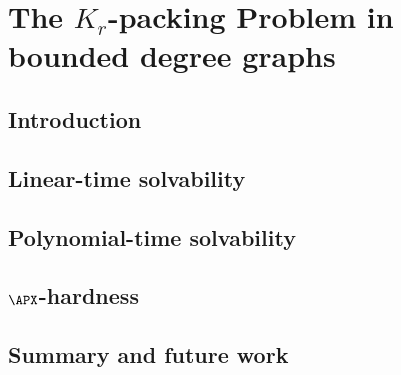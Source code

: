\chapter{The \texorpdfstring{$K_r$}{Kr}-packing Problem in bounded degree graphs}
\label{c:kr_packing}

\section{Introduction}
\label{sec:krpacking_intro}


\section{Linear-time solvability}
\label{sec:krpacking_lineartime}


\section{Polynomial-time solvability}
\label{sec:krpacking_ptime}


\section{\texorpdfstring{$\APX$}{APX}-hardness}
\label{sec:krpacking_apxhardness}


\section{Summary and future work}
\label{sec:krpacking_conclusion}
